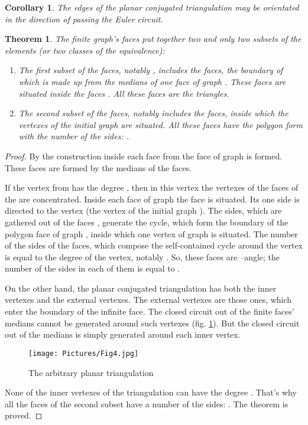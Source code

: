\documentclass{amsart}
\newtheorem{theorem}{Theorem}
\theoremstyle{plain}
\newtheorem{corollary}{Corollary}
\numberwithin{equation}{section}
\begin{document}
\begin{corollary}
The edges  of the planar conjugated triangulation may be orientated in the direction of passing the Euler circuit.
\end {corollary}

\begin{theorem}
The finite graph's  faces  put together two and only two subsets of the elements (or two classes of the equivalence):

\begin{enumerate}
\item	
The first subset of the faces, notably , includes the faces, the boundary of which is made up from the medians of one face of graph . These faces are situated inside the faces . All these faces  are the triangles.
\item	
The second subset of the faces, notably  includes the faces, inside which the vertexes  of the initial graph are situated. All these faces have the polygon form with the number of the sides: .
\end{enumerate}
\end {theorem}

\begin {proof}
By the construction inside each face  from  the face  of graph  is formed. These faces are formed by the medians of the  faces.

If the vertex  from  has the degree , then in this vertex the vertexes of the  faces of the  are concentrated. Inside each face  of graph  the face  is situated. Its one side is directed to the  vertex (the vertex of the initial graph ). The sides, which are gathered out of the faces , generate the cycle, which form the boundary of the polygon face of graph , inside which one vertex of graph  is situated. The number of the sides of the  faces, which compose the self-contained cycle around the  vertex is equal to the degree of the vertex, notably . So, these faces are --angle; the number of the sides in each of them is equal to .

On the other hand, the planar conjugated triangulation has both the inner vertexes and the external vertexes. The external vertexes are those ones, which enter the boundary of the infinite face. The closed circuit out of the finite faces' medians cannot be generated around such vertexes (fig. \ref{Fig:4}). But the closed circuit out of the medians is simply generated around each inner vertex.

\begin{figure}[htp]
		\texttt{[image: Pictures/Fig4.jpg]}
	\caption{The arbitrary planar triangulation}
	\label{Fig:4}
\end{figure}

None of the inner vertexes of the triangulation  can have the degree . That's why all the faces of the second subset  have a number of the sides: . The theorem is proved.
\end {proof}
\end{document}
